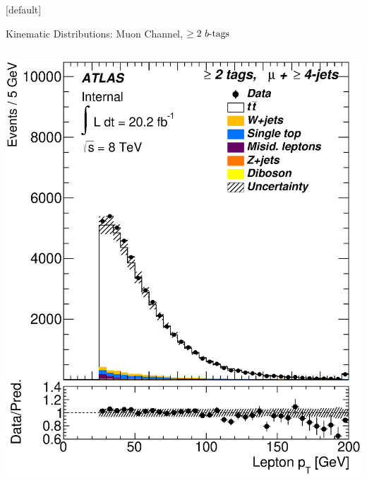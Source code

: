 \documentclass{beamer}
\begin{document}
{  \makeatletter %
  [default]
  \def\beamer@entrycode{\vspace*{-1.075\headheight}}
  \begin{frame}{Kinematic Distributions: Muon Channel, $\geq2\text{ } \lowercase{ b\text{-tags}}$}
    \vspace{5pt}
    \begin{columns}
      \includegraphics[width=.95\textwidth]{../chapters/whel/figures/control_Plots2/bTag_2incl/LeptonPt_mu}\\

\end{columns}
\end{frame}}
\end{document}

